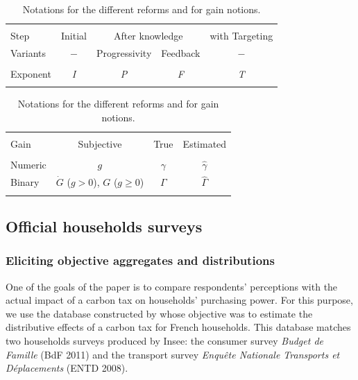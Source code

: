 \documentclass[11pt]{article}
\begin{document}

\begin{table}[H]
\caption{Notations for the different reforms and for gain notions.}
\label{tab:notations}

\centering \begin{tabular}{lcccc}
\\[-1.8ex]\hline 
\hline\\[-2.6ex] Step & Initial & \multicolumn{2}{c}{After knowledge} & with Targeting\tabularnewline

Variants & $-$ & Progressivity & Feedback & $-$\tabularnewline
 \hline \\[-2.3ex] 
Exponent & \emph{I} & \emph{P} & \emph{F} & \emph{T} \\ 
\hline 
\hline \\[-1.8ex] 
\end{tabular}

\medskip

\centering \begin{tabular}{lccc}
\\[-1.8ex]\hline 
\hline \\[-2.6ex] 
Gain & Subjective & True & Estimated\tabularnewline
 \hline \\[-2.3ex] 
Numeric & $g$ & $\gamma$ & $\widehat{\gamma}$\tabularnewline
Binary & $\dot{G}$ ($g>0$), $G$ ($g\geq0$) & $\Gamma$ & $\widehat{\Gamma}$ \\ 
\hline 
\hline \\[-1.8ex] 
\end{tabular}

\end{table}

\subsection{Official households surveys\label{subsec:Households-surveys}}

    \subsubsection{Eliciting objective aggregates and distributions \label{subsubsec:comparing-obj-subj}}
One of the goals of the paper is to compare respondents' perceptions with the actual impact of a carbon tax on households' purchasing power. For this purpose, we use the database constructed by \citet{douenne_vertical_2018} whose objective was to estimate the distributive effects of a carbon tax for French households. This database matches two households surveys produced by Insee: the consumer survey \emph{Budget de Famille} (BdF 2011) and the transport survey \emph{Enquête Nationale Transports et Déplacements} (ENTD 2008).
\end{document}
